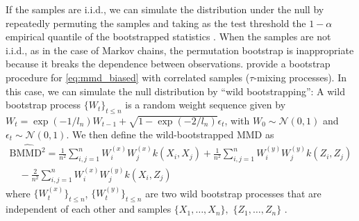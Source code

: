 \documentclass{article}
\newcommand{\tildepi}{\tilde{\pi}}
\begin{document}
If the samples are i.i.d., we can simulate the distribution under the null by repeatedly permuting the samples and taking as the test threshold the ${1-\alpha}$ empirical quantile of the bootstrapped statistics \citep{gretton_kernel_2012}. 
When the samples are not i.i.d., as in the case of Markov chains, the permutation bootstrap is inappropriate because it breaks the dependence between observations.
\citet{chwialkowski_wild_2014} provide a bootstrap procedure for \eqref{eq:mmd_biased} with correlated samples ($\tau$-mixing processes).
In this case, we can simulate the null distribution by ``wild bootstrapping'': A wild bootstrap process $\{W_t\}_{t\leq n}$ is a random weight sequence
given by $W_{t}=\exp(-1/l_n) W_{t-1}+\sqrt{1-\exp(-2/{l_n})}\epsilon_{t}$,
with $W_{0} \sim \mathcal{N}(0,1)$ and $\epsilon_{t} \sim \mathcal{N}(0,1)$. We then define the wild-bootstrapped MMD as
\begin{equation}
\begin{array}{c}
\widehat{\mathrm{BMMD}^2}=\frac{1}{n^2} \sum_{i,j=1}^{n} W_{i}^{(x)} W_{j}^{(x)} k\left(X_{i}, X_{j}\right)+\frac{1}{n^2} \sum_{i,j=1}^{n} W_{i}^{(y)} W_{j}^{(y)} k\left(Z_{i}, Z_{j}\right) \\
\quad-\frac{2}{n^2} \sum_{i,j=1}^{n}W_{i}^{(x)} W_{j}^{(y)} k\left(X_{i}, Z_{j}\right)
\end{array}
\label{eq:wb_mmd}
\end{equation}
where $\{W_{t}^{(x)}\}_{t\leq n}$, $\{W_{t}^{(y)}\}_{t\leq n}$ are two wild bootstrap processes that
are independent of each other and samples $\{X_1, \dots, X_n\},$ $\{Z_1, \dots, Z_n\}$ \cite[see][]{chwialkowski_wild_2014, leucht_dependent_2013}.


    
\end{document}
